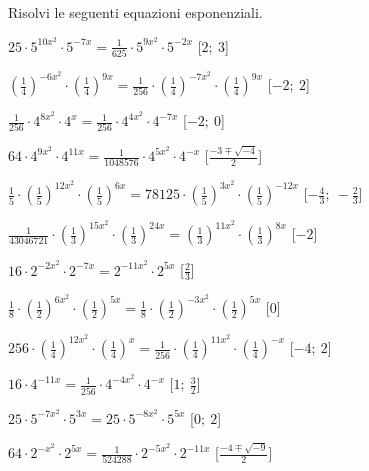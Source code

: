 \begin{esercizio}\label{ese:}
 Risolvi le seguenti equazioni esponenziali.
 \begin{enumeratea}
  \item  \(25 \cdot 5^{{10x^2}} \cdot 5^{{-7x}} = \frac{1}{625} \cdot 5^{{9x^2}} 
\cdot 5^{{-2x}}\)
   \hfill [\(2;~3\)]
  \item  \(\left(\frac{1}{4}\right)^{{-6x^2}} \cdot 
\left(\frac{1}{4}\right)^{{9x}} = \frac{1}{256} \cdot 
\left(\frac{1}{4}\right)^{{-7x^2}} \cdot \left(\frac{1}{4}\right)^{{9x}}\)
   \hfill [\(-2;~2\)]
  \item  \(\frac{1}{256} \cdot 4^{{8x^2}} \cdot 4^{{x}} = \frac{1}{256} \cdot 
4^{{4x^2}} \cdot 4^{{-7x}}\)
   \hfill [\(-2;~0\)]
  \item  \(64 \cdot 4^{{9x^2}} \cdot 4^{{11x}} = \frac{1}{1048576} \cdot 
4^{{5x^2}} \cdot 4^{{-x}}\)
   \hfill [\(\frac{-3 \mp \sqrt{-4}} 2\)]
  \item  \(\frac{1}{5} \cdot \left(\frac{1}{5}\right)^{{12x^2}} \cdot 
\left(\frac{1}{5}\right)^{{6x}} = 78125 \cdot \left(\frac{1}{5}\right)^{{3x^2}} 
\cdot \left(\frac{1}{5}\right)^{{-12x}}\)
   \hfill [\(-\frac{4}{3};~-\frac{2}{3}\)]
  \item  \(\frac{1}{43046721} \cdot \left(\frac{1}{3}\right)^{{15x^2}} \cdot 
\left(\frac{1}{3}\right)^{{24x}} = \left(\frac{1}{3}\right)^{{11x^2}} \cdot 
\left(\frac{1}{3}\right)^{{8x}}\)
   \hfill [\(-2\)]
  \item  \(16 \cdot 2^{{-2x^2}} \cdot 2^{{-7x}} = 2^{{-11x^2}} \cdot 2^{{5x}}\)
   \hfill [\(\frac{2}{3}\)]
  \item  \(\frac{1}{8} \cdot \left(\frac{1}{2}\right)^{{6x^2}} \cdot 
\left(\frac{1}{2}\right)^{{5x}} = \frac{1}{8} \cdot 
\left(\frac{1}{2}\right)^{{-3x^2}} \cdot \left(\frac{1}{2}\right)^{{5x}}\)
   \hfill [\(0\)]
  \item  \(256 \cdot \left(\frac{1}{4}\right)^{{12x^2}} \cdot 
\left(\frac{1}{4}\right)^{{x}} = \frac{1}{256} \cdot 
\left(\frac{1}{4}\right)^{{11x^2}} \cdot \left(\frac{1}{4}\right)^{{-x}}\)
   \hfill [\(-4;~2\)]
  \item  \(16 \cdot 4^{{-11x}} = \frac{1}{256} \cdot 4^{{-4x^2}} \cdot 
4^{{-x}}\)
   \hfill [\(1;~\frac{3}{2}\)]
  \item  \(25 \cdot 5^{{-7x^2}} \cdot 5^{{3x}} = 25 \cdot 5^{{-8x^2}} \cdot 
5^{{5x}}\)
   \hfill [\(0;~2\)]
  \item  \(64 \cdot 2^{{-x^2}} \cdot 2^{{5x}} = \frac{1}{524288} \cdot 
2^{{-5x^2}} \cdot 2^{{-11x}}\)
   \hfill [\(\frac{-4 \mp \sqrt{-9}} 2\)]

\end{enumeratea}
\end{esercizio}

